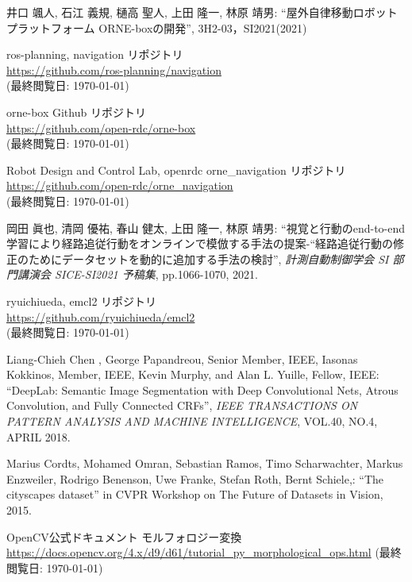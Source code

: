 \documentclass[uplatex, twocolumn, 9pt]{jsproceedings}
\begin{document}
\footnotesize
\begin{thebibliography}{99}

井口 颯人, 石江 義規, 樋高 聖人, 上田 隆一, 林原 靖男: ``屋外自律移動ロボットプラットフォーム ORNE-boxの開発'', 3H2-03，SI2021(2021)

ros-planning, navigation リポジトリ\\
\url{https://github.com/ros-planning/navigation}\\
(最終閲覧日: \today)

orne-box Github リポジトリ\\
\url{https://github.com/open-rdc/orne-box}\\
(最終閲覧日: \today)

Robot Design and Control Lab, openrdc orne\_navigation リポジトリ\\
\url{https://github.com/open-rdc/orne_navigation}\\
(最終閲覧日: \today)

岡田 眞也, 清岡 優祐, 春山 健太, 上田 隆一, 林原 靖男: ``視覚と行動のend-to-end学習により経路追従行動をオンラインで模倣する手法の提案-“経路追従行動の修正のためにデータセットを動的に追加する手法の検討'', \textit{計測自動制御学会 SI 部門講演会 SICE-SI2021 予稿集}, pp.1066-1070, 2021.

ryuichiueda, emcl2 リポジトリ\\
\url{https://github.com/ryuichiueda/emcl2}\\
(最終閲覧日: \today)

Liang-Chieh Chen , George Papandreou, Senior Member, IEEE, Iasonas Kokkinos, Member, IEEE,
Kevin Murphy, and Alan L. Yuille, Fellow, IEEE: ``DeepLab: Semantic Image Segmentation with
Deep Convolutional Nets, Atrous Convolution, and Fully Connected CRFs'', \textit{IEEE TRANSACTIONS ON PATTERN ANALYSIS AND MACHINE INTELLIGENCE}, VOL.40, NO.4, APRIL 2018.

Marius Cordts, Mohamed Omran, Sebastian Ramos, Timo Scharwachter, Markus Enzweiler, Rodrigo Benenson, Uwe Franke, Stefan Roth, Bernt Schiele,: ``The cityscapes dataset'' in CVPR Workshop on The Future of Datasets in Vision, 2015.

OpenCV公式ドキュメント モルフォロジー変換\\
\url{https://docs.opencv.org/4.x/d9/d61/tutorial_py_morphological_ops.html}
(最終閲覧日: \today)


\end{thebibliography}
\end{document}
